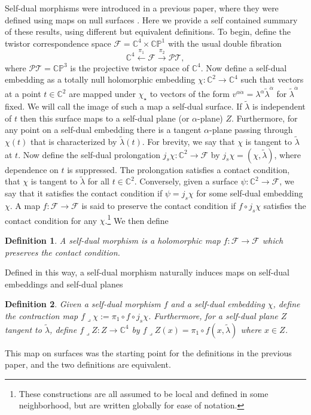 \documentclass[12pt]{article}
\newcommand{\mbb}{\mathbb}
\newcommand{\prol}[1]{j_s#1}
\newtheorem{mydef}{Definition}
\begin{document}
Self-dual morphisms were introduced in a previous paper, where they were defined using maps on null surfaces \cite{https://doi.org/10.48550/arxiv.2203.07952}.  Here we provide a self contained summary of these results, using different but equivalent definitions.   To begin, define the twistor correspondence space $\mathcal{F}=\mbb{C}^4\times \mbb{C}\mbb{P}^1$ with the usual double fibration \cite{dunajski2010solitons}\cite{ward1991twistor}
\begin{equation}\label{eq:doublefib}
\mbb{C}^4\xleftarrow{\pi_1} \mathcal{F} \xrightarrow{\pi_2} \mathcal{P}\mathcal{T},
\end{equation}
where $\mathcal{P}\mathcal{T}=\mbb{C}\mbb{P}^3$ is the projective twistor space of $\mbb{C}^4$.  Now define a self-dual embedding as a totally null holomorphic embedding $\chi:\mbb{C}^2\rightarrow \mbb{C}^4$ such that vectors at a point $t\in \mbb{C}^2$ are mapped under $\chi_\star$ to vectors of the form $v^{\alpha\dot{\alpha}}=\lambda^\alpha\tilde{\lambda}^{\dot{\alpha}}$ for $\tilde{\lambda}^{\dot{\alpha}}$ fixed.  We will call the image of such a map a self-dual surface.  If $\tilde{\lambda}$ is independent of $t$ then this surface maps to a self-dual plane (or $\alpha$-plane) $Z$. Furthermore, for any point on a self-dual embedding there is a tangent $\alpha$-plane passing through $\chi(t)$ that is characterized by $\tilde{\lambda}(t)$.  For brevity, we say that $\chi$ is tangent to $\tilde{\lambda}$ at $t$.  Now define the self-dual prolongation $\prol{\chi}:\mbb{C}^2\rightarrow \mathcal{F}$ by $\prol{\chi}=(\chi,\tilde{\lambda})$, where dependence on $t$ is suppressed.  The prolongation satisfies a contact condition, that $\chi$ is tangent to $\tilde{\lambda}$ for all $t\in \mbb{C}^2$.  Conversely, given a surface $\psi:\mbb{C}^2\rightarrow \mathcal{F}$, we say that it satisfies the contact condition if $\psi=\prol{\chi}$ for some self-dual embedding $\chi$.  A map $f:\mathcal{F}\rightarrow \mathcal{F}$ is said to preserve the contact condition if $f\circ \prol{\chi}$ satisfies the contact condition for any $\chi$.\footnote{These constructions are all assumed to be local and defined in some neighborhood, but are written globally for ease of notation.}  We  then define
\begin{mydef}
A self-dual morphism is a holomorphic map $f:\mathcal{F}\rightarrow \mathcal{F}$ which preserves the contact condition.
\end{mydef}
  Defined in this way, a self-dual morphism naturally induces maps on self-dual embeddings and self-dual planes
  \begin{mydef}
  Given a self-dual morphism $f$ and a self-dual embedding $\chi$, define the contraction map $f\lrcorner \chi := \pi_1\circ f\circ \prol{\chi}$.  Furthermore, for a self-dual plane $Z$ tangent to $\tilde{\lambda}$, define $f\lrcorner Z:Z\rightarrow \mbb{C}^4$ by $f\lrcorner Z(x)=\pi_1\circ f(x,\tilde{\lambda})$ where $x\in Z$. 
 \end{mydef}
This map on surfaces was the starting point for the definitions in the previous paper, and the two definitions are equivalent.
\end{document}
